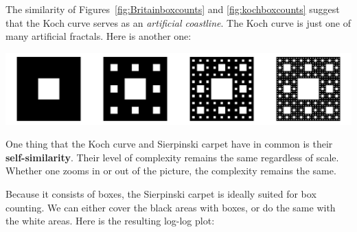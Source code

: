 The similarity of Figures~\ref{fig:Britainboxcounts} and
\ref{fig:kochboxcounts} suggest that the Koch curve serves as an
\emph{artificial coastline}. The Koch curve is just one of many
artificial fractals. Here is another one:\medskip

\noindent\includegraphics[width=\textwidth]{../figures/sierpinski.pdf}
\begingroup {}
\label{fig:sierpinski}
\endgroup

One thing that the Koch curve and Sierpinski carpet have in common
is their \textbf{self-similarity}. Their level of complexity remains
the same regardless of scale. Whether one zooms in or out of the picture,
the complexity remains the same.\medskip

Because it consists of boxes, the Sierpinski carpet is ideally suited
for box counting. We can either cover the black areas with boxes, or
do the same with the white areas. Here is the resulting log-log
plot:\medskip

